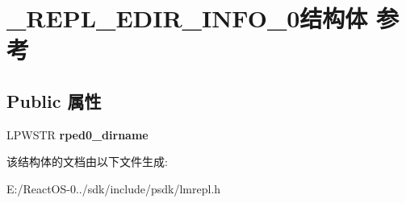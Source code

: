 \hypertarget{struct___r_e_p_l___e_d_i_r___i_n_f_o__0}{}\section{\+\_\+\+R\+E\+P\+L\+\_\+\+E\+D\+I\+R\+\_\+\+I\+N\+F\+O\+\_\+0结构体 参考}
\label{struct___r_e_p_l___e_d_i_r___i_n_f_o__0}
\subsection*{Public 属性}
\begin{DoxyCompactItemize}
\item 
\mbox{\label{struct___r_e_p_l___e_d_i_r___i_n_f_o__0_a56e2c2d5ea438fd5945adaea25a2de5d}} 
L\+P\+W\+S\+TR {\bfseries rped0\+\_\+dirname}
\end{DoxyCompactItemize}


该结构体的文档由以下文件生成\+:\begin{DoxyCompactItemize}
\item 
E\+:/\+React\+O\+S-\/0../sdk/include/psdk/lmrepl.\+h\end{DoxyCompactItemize}
